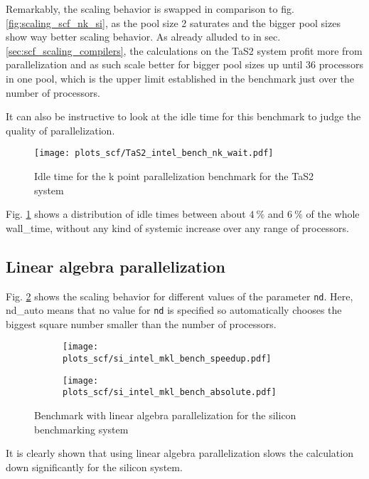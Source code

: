 \documentclass[main.tex]{subfiles}
\begin{document}
Remarkably, the scaling behavior is swapped in comparison to fig. \ref{fig:scaling_scf_nk_si}, as the pool size 2 saturates and the bigger pool sizes show way better scaling behavior.
As already alluded to in sec. \ref{sec:scf_scaling_compilers}, the calculations on the TaS2 system profit more from parallelization and as such scale better for bigger pool sizes up until 36 processors in one pool, which is the upper limit established in the benchmark just over the number of processors.


It can also be instructive to look at the idle time for this benchmark to judge the quality of parallelization. 
\begin{figure}[ht!]
    \centering
    \texttt{[image: plots\_scf/TaS2\_intel\_bench\_nk\_wait.pdf]}
    \caption{Idle time for the k point parallelization benchmark for the TaS2 system}
    \label{fig:scaling_scf_nk_tas2_wait}
\end{figure}

Fig. \ref{fig:scaling_scf_nk_tas2_wait} shows a distribution of idle times between about \(\SI{4}{\percent}\) and \(\SI{6}{\percent}\) of the whole \gls{wall_time}, without any kind of systemic increase over any range of processors.

\subsection{Linear algebra parallelization}

Fig. \ref{fig:scaling_scf_nd_si} shows the scaling behavior for different values of the parameter \texttt{nd}.
Here, nd\_auto means that no value for \texttt{nd} is specified so \QE automatically chooses the biggest square number smaller than the number of processors.
\begin{figure}[ht!]
\begin{subfigure}[b]{0.49\textwidth}
    \centering
    \texttt{[image: plots\_scf/si\_intel\_mkl\_bench\_speedup.pdf]}
\end{subfigure}
\begin{subfigure}[b]{0.49\textwidth}
    \centering
    \texttt{[image: plots\_scf/si\_intel\_mkl\_bench\_absolute.pdf]}
\end{subfigure}
\label{fig:scaling_scf_nd_si}
\caption{Benchmark with linear algebra parallelization for the silicon benchmarking system}
\end{figure}
It is clearly shown that using linear algebra parallelization slows the calculation down significantly for the silicon system.
\end{document}

